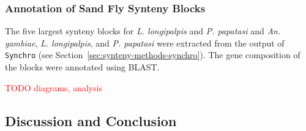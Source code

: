 \subsubsection{Annotation of Sand Fly Synteny Blocks}
The five largest synteny blocks for \emph{L. longipalpis} and \emph{P. papatasi} and \emph{An. gambiae}, \emph{L. longipalpis}, and \emph{P. papatasi} were extracted from the output of \texttt{Synchro} (see Section~\ref{sec:synteny-methods-synchro}).  The gene composition of the blocks were annotated using BLAST.

\textcolor{red}{TODO diagrams, analysis}

\subsection{Discussion and Conclusion}